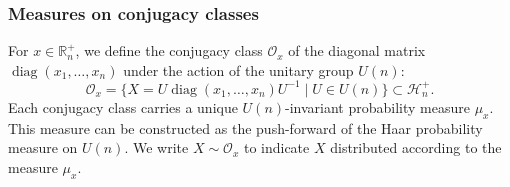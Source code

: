 \documentclass[notitlepage, 11pt, letterpaper]{amsart}
\theoremstyle{plain}
\theoremstyle{definition}
\DeclareMathOperator{\diag}{diag}
\newcommand{\orbit}{\mathcal O}
\newcommand{\hermp}[1]{\mathcal H^{+}_{#1}}
\newcommand{\eigsp}[1]{\mathbb R^{+}_{#1}}
\begin{document}
\subsubsection{Measures on conjugacy classes}
For $x \in \eigsp{n}$, we define the conjugacy class $\orbit_x$ of the diagonal matrix
$\diag(x_1, \ldots, x_n)$ under the action of the unitary group $U(n)$:
\begin{equation}
    \orbit_x = \{ X = U\diag(x_1, \ldots, x_n)U^{-1} \mid U \in U(n)\} \subset \hermp{n}.
\end{equation}
Each conjugacy class carries a unique $U(n)$-invariant probability measure $\mu_x$.
This measure can be constructed as the push-forward of the Haar probability measure on $U(n)$.
We write $X \sim \orbit_x$ to indicate $X$ distributed according to the measure $\mu_x$.
\end{document}
